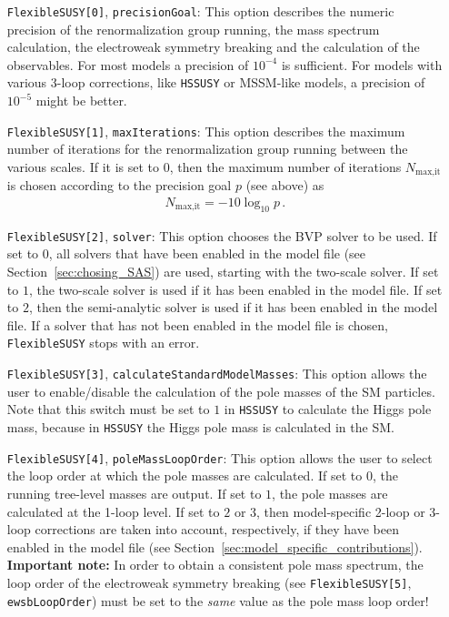\documentclass[final,3p,11pt,pdflatex]{elsarticle}
\makeatletter
\newcommand{\modelname}[1]{\texttt{#1}\@\xspace}
\newcommand{\fs}{\texttt{FlexibleSUSY}\@\xspace}
\newcommand{\HSSUSY}{\modelname{HSSUSY}}
\newcommand{\secref}[1]{Section~\ref{#1}}
\makeatother
\begin{document}
\begin{itemize}
\item[\texttt{FlexibleSUSY[0]},] \texttt{precisionGoal}: This option
  describes the numeric precision of the renormalization group
  running, the mass spectrum calculation, the electroweak symmetry
  breaking and the calculation of the observables.  For most models a
  precision of $10^{-4}$ is sufficient.  For models with various
  3-loop corrections, like \HSSUSY or MSSM-like models, a
  precision of $10^{-5}$ might be better.

\item[\texttt{FlexibleSUSY[1]},] \texttt{maxIterations}: This option
  describes the maximum number of iterations for the renormalization
  group running between the various scales.  If it is set to $0$, then
  the maximum number of iterations $N_{\text{max,it}}$ is chosen
  according to the precision goal $p$ (see above) as
  \begin{align}
    N_{\text{max,it}} = - 10\log_{10} p \,.
  \end{align}

\item[\texttt{FlexibleSUSY[2]},] \texttt{solver}: This option chooses
  the BVP solver to be used.  If set to $0$, all
  solvers that have been enabled in the model file (see
  \secref{sec:chosing_SAS}) are used, starting with the two-scale
  solver.  If set to $1$, the two-scale solver is used if it has been
  enabled in the model file.  If set to $2$, then the semi-analytic
  solver is used if it has been enabled in the model file.  If a
  solver that has not been enabled in the model file is chosen, \fs
  stops with an error.

\item[\texttt{FlexibleSUSY[3]},]
  \texttt{calculateStandardModelMasses}: This option allows the user
  to enable/disable the calculation of the pole masses of the SM
  particles.  Note that this switch must be set to $1$ in
  \HSSUSY to calculate the Higgs pole mass, because in \HSSUSY the
  Higgs pole mass is calculated in the SM\@.

\item[\texttt{FlexibleSUSY[4]},] \texttt{poleMassLoopOrder}: This
  option allows the user to select the loop order at which the pole
  masses are calculated.  If set to $0$, the running tree-level masses
  are output.  If set to $1$, the pole masses are calculated at the
  1-loop level.  If set to $2$ or $3$, then model-specific 2-loop or
  3-loop corrections are taken into account, respectively, if they have been
  enabled in the model file (see
  \secref{sec:model_specific_contributions}).  \textbf{Important
    note:} In order to obtain a consistent pole mass spectrum, the
  loop order of the electroweak symmetry breaking (see
  \texttt{FlexibleSUSY[5]}, \texttt{ewsbLoopOrder}) must be set to the
  \emph{same} value as the pole mass loop order!


\end{itemize}
\end{document}
